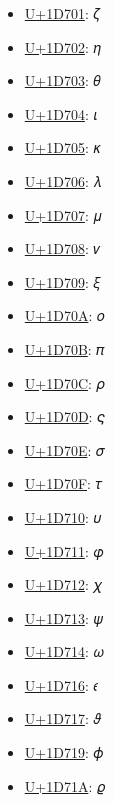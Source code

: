 \begin{itemize}
	\item \href{https://www.compart.com/en/unicode/U+1D701}{U+1D701}: 𝜁
	\item \href{https://www.compart.com/en/unicode/U+1D702}{U+1D702}: 𝜂
	\item \href{https://www.compart.com/en/unicode/U+1D703}{U+1D703}: 𝜃
	\item \href{https://www.compart.com/en/unicode/U+1D704}{U+1D704}: 𝜄
	\item \href{https://www.compart.com/en/unicode/U+1D705}{U+1D705}: 𝜅
	\item \href{https://www.compart.com/en/unicode/U+1D706}{U+1D706}: 𝜆
	\item \href{https://www.compart.com/en/unicode/U+1D707}{U+1D707}: 𝜇
	\item \href{https://www.compart.com/en/unicode/U+1D708}{U+1D708}: 𝜈
	\item \href{https://www.compart.com/en/unicode/U+1D709}{U+1D709}: 𝜉
	\item \href{https://www.compart.com/en/unicode/U+1D70A}{U+1D70A}: 𝜊
	\item \href{https://www.compart.com/en/unicode/U+1D70B}{U+1D70B}: 𝜋
	\item \href{https://www.compart.com/en/unicode/U+1D70C}{U+1D70C}: 𝜌
	\item \href{https://www.compart.com/en/unicode/U+1D70D}{U+1D70D}: 𝜍
	\item \href{https://www.compart.com/en/unicode/U+1D70E}{U+1D70E}: 𝜎
	\item \href{https://www.compart.com/en/unicode/U+1D70F}{U+1D70F}: 𝜏
	\item \href{https://www.compart.com/en/unicode/U+1D710}{U+1D710}: 𝜐
	\item \href{https://www.compart.com/en/unicode/U+1D711}{U+1D711}: 𝜑
	\item \href{https://www.compart.com/en/unicode/U+1D712}{U+1D712}: 𝜒
	\item \href{https://www.compart.com/en/unicode/U+1D713}{U+1D713}: 𝜓
	\item \href{https://www.compart.com/en/unicode/U+1D714}{U+1D714}: 𝜔
	\item \href{https://www.compart.com/en/unicode/U+1D716}{U+1D716}: 𝜖
	\item \href{https://www.compart.com/en/unicode/U+1D717}{U+1D717}: 𝜗
	\item \href{https://www.compart.com/en/unicode/U+1D719}{U+1D719}: 𝜙
	\item \href{https://www.compart.com/en/unicode/U+1D71A}{U+1D71A}: 𝜚

\end{itemize}
